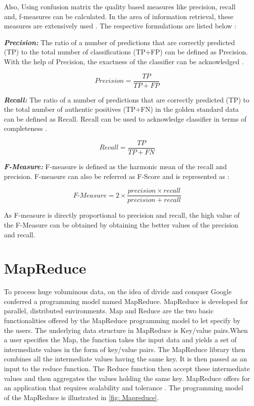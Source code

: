 \par Also, Using confusion matrix the quality based measures like precision, recall and, f-measures can be calculated. In the area of information retrieval, these measures are extensively used \cite{christen2007quality}. The respective formulations are listed below \cite{tripathy2015classification}:

\textbf{\textit{Precision:}} The ratio of a number of predictions that are correctly predicted (TP) to the total number of classifications (TP+FP) can be defined as Precision. With the help of Precision, the exactness of the classifier can be acknowledged \cite{tripathy2015classification}.

\begin{equation}\label{formula: Precision}
\textit{Precision} = \frac{TP}{TP+FP}
\end{equation}

\textbf{\textit{Recall:}} The ratio of a number of predictions that are correctly predicted (TP) to the total number of authentic positives (TP+FN) in the golden standard data can be defined as Recall. Recall can be used to acknowledge classifier in terms of completeness \cite{tripathy2015classification}.

\begin{equation}\label{formula: Recall}
\textit{Recall} = \frac{TP}{TP+FN}
\end{equation}

\textbf{\textit{F-Measure:}} F-measure is defined as the harmonic mean of the recall and precision. F-measure can also be referred as F-Score and is represented as \cite{tripathy2015classification}:


\begin{equation}\label{formula: F-Measure}
\textit{F-Measure} = 2 \times \frac{precision \times recall}{precision+recall}
\end{equation}

As F-measure is directly proportional to precision and recall, the high value of the F-Measure can be obtained by obtaining the better values of the precision and recall.


\section{MapReduce}
\label{section: Mapreduce}
To process huge voluminous data, on the idea of divide and conquer Google conferred a programming model named MapReduce. MapReduce is developed for parallel, distributed environments. Map and Reduce are the two basic functionalities offered by the MapReduce programming model to let specify by the users. The underlying data structure in MapReduce is Key/value pairs.When a user specifies the Map, the function takes the input data and yields a set of intermediate values in the form of key/value pairs. The MapReduce library then combines all the intermediate values having the same key. It is then passed as an input to the reduce function. The Reduce function then accept these intermediate values and then aggregates the values holding the same key. MapReduce offers for an application that requires scalability and tolerance \cite{dean2010mapreduce}. The programming model of the MapReduce is illustrated in \ref{fig: Mapreduce}.

